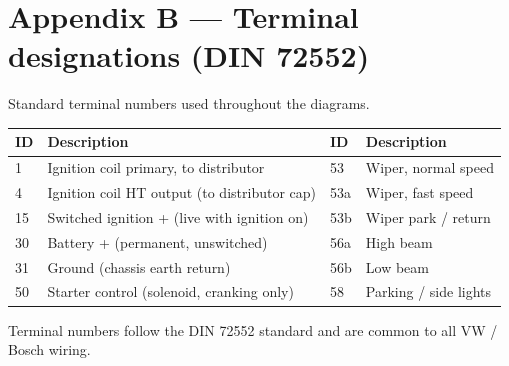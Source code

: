 \documentclass[11pt]{article}
\begin{document}
\section{Appendix B — Terminal designations (DIN 72552)}
{\small Standard terminal numbers used throughout the diagrams.}\\[6pt]
\begin{center}\small
\begin{tabular}{|l|p{78mm}|l|p{78mm}|}
\hline
\textbf{ID} & \textbf{Description} & \textbf{ID} & \textbf{Description} \\ \hline
1 & Ignition coil primary, to distributor & 53 & Wiper, normal speed \\ \hline
4 & Ignition coil HT output (to distributor cap) & 53a & Wiper, fast speed \\ \hline
15 & Switched ignition + (live with ignition on) & 53b & Wiper park / return \\ \hline
30 & Battery + (permanent, unswitched) & 56a & High beam \\ \hline
31 & Ground (chassis earth return) & 56b & Low beam \\ \hline
50 & Starter control (solenoid, cranking only) & 58 & Parking / side lights \\ \hline
\end{tabular}
\end{center}
\vspace{6pt}\par{\footnotesize\color{gray} Terminal numbers follow the DIN 72552 standard and are common to all VW / Bosch wiring.}
\clearpage
\end{document}
